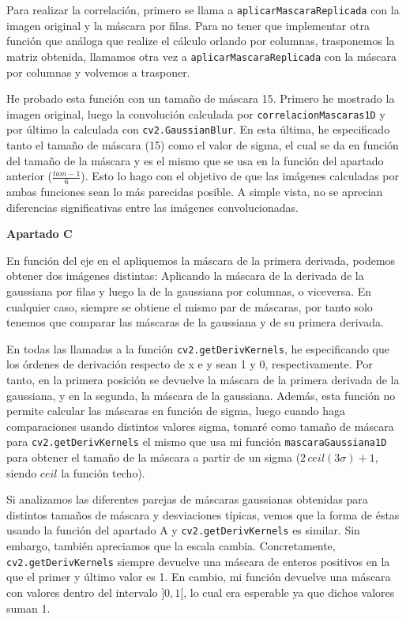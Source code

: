 \documentclass[10pt,a4paper]{article}
\begin{document}
\begin{list}{•}{}
Para realizar la correlación, primero se llama a \texttt{aplicarMascaraReplicada} con la imagen original y la máscara por filas. Para no tener que implementar otra función que análoga que realize el cálculo orlando por columnas, trasponemos la matriz obtenida, llamamos otra vez a \texttt{aplicarMascaraReplicada} con la máscara por columnas y volvemos a trasponer.

He probado esta función con un tamaño de máscara 15. Primero he mostrado la imagen original, luego la convolución calculada por \texttt{correlacionMascaras1D} y por último la calculada con \texttt{cv2.GaussianBlur}. En esta última, he especificado tanto el tamaño de máscara (15) como el valor de sigma, el cual se da en función del tamaño de la máscara y es el mismo que se usa en la función del apartado anterior ($\frac{tam-1}{6}$). Esto lo hago con el objetivo de que las imágenes calculadas por ambas funciones sean lo más parecidas posible. A simple vista, no se aprecian diferencias significativas entre las imágenes convolucionadas.

\hfill \break




\item \textbf{\large Apartado C}

En función del eje en el apliquemos la máscara de la primera derivada, podemos obtener dos imágenes distintas: Aplicando la máscara de la derivada de la gaussiana por filas y luego la de la gaussiana por columnas, o viceversa. En cualquier caso, siempre se obtiene el mismo par de máscaras, por tanto solo tenemos que comparar las máscaras de la gaussiana y de su primera derivada.

En todas las llamadas a la función \texttt{cv2.getDerivKernels}, he especificando que los órdenes de derivación respecto de x e y sean 1 y 0, respectivamente. Por tanto, en la primera posición se devuelve la máscara de la primera derivada de la gaussiana, y en la segunda, la máscara de la gaussiana. Además, esta función no permite calcular las máscaras en función de sigma, luego cuando haga comparaciones usando distintos valores sigma, tomaré como tamaño de máscara para \texttt{cv2.getDerivKernels} el mismo que usa mi función \texttt{mascaraGaussiana1D} para obtener el tamaño de la máscara a partir de un sigma ($2 \, ceil(3 \sigma) + 1$, siendo $ceil$ la función techo).

Si analizamos las diferentes parejas de máscaras gaussianas obtenidas para distintos tamaños de máscara y desviaciones típicas, vemos que la forma de éstas usando la función del apartado A y \texttt{cv2.getDerivKernels} es similar. Sin embargo, también apreciamos que la escala cambia. Concretamente, \texttt{cv2.getDerivKernels} siempre devuelve una máscara de enteros positivos en la que el primer y último valor es 1. En cambio, mi función devuelve una máscara con valores dentro del intervalo $]0,1[$, lo cual era esperable ya que dichos valores suman 1.


\end{list}
\end{document}
